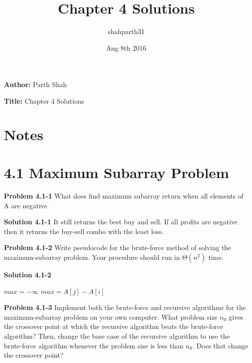 \documentclass{article}
\title{Chapter 4 Solutions}
\author{shahparth31}
\date{Aug 8th 2016}
\begin{document}
\setlength{\parindent}{0pt}

\medskip

\hrulefill

\medskip

{\bf Author:} Parth Shah

\medskip

{\bf Title:} Chapter 4 Solutions

\hrulefill

\section*{Notes}


\section*{4.1 Maximum Subarray Problem}

\hrulefill

\medskip

\textbf{Problem 4.1-1} What does find maximum subarray return when all elements of A are negative.

\medskip

\textbf{Solution 4.1-1} It still returns the best buy and sell. If all profits are negative then it returns the buy-sell combo with the least loss.

\hrulefill

\medskip

\textbf{Problem 4.1-2} Write pseudocode for the brute-force method of solving the maximum-subarray problem. Your procedure should run in $\Theta(n^2)$ time.

\medskip

\textbf{Solution 4.1-2}

\begin{algorithm}
\begin{algorithmic}[1]
\State $max = -\infty$
			\State $max = A[j] - A[i]$
		\EndIf
	\EndFor		
\EndFor
\EndProcedure
\end{algorithmic}
\end{algorithm}

\hrulefill

\medskip

\textbf{Problem 4.1-3} Implement both the brute-force and recursive algorithms for the maximum-subarray problem on your own computer. What problem size $n_0$ gives the crossover point at which the recursive algorithm beats the brute-force algorithm? Then, change the base case of the recursive algorithm to use the brute-force algorithm whenever the problem size is less than $n_0$. Does that change the crossover point?
\end{document}
